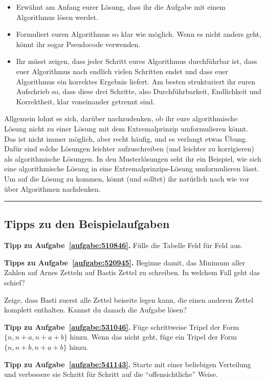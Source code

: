 \begin{itemize}
	\item Erwähnt am Anfang eurer Lösung, dass ihr die Aufgabe mit einem Algorithmus lösen werdet.
	\item Formuliert euren Algorithmus so klar wie möglich. Wenn es nicht anders geht, könnt ihr sogar Pseudocode verwenden.
	\item Ihr müsst zeigen, dass jeder Schritt eures Algorithmus durchführbar ist, dass euer Algorithmus nach endlich vielen Schritten endet und dass euer Algorithmus ein korrektes Ergebnis liefert. Am besten strukturiert ihr euren Aufschrieb so, dass diese drei Schritte, also Durchführbarkeit, Endlichkeit und Korrektheit, klar voneinander getrennt sind.
\end{itemize}
Allgemein lohnt es sich, darüber nachzudenken, ob ihr eure algorithmische Lösung nicht zu einer Lösung mit dem Extremalprinzip umformulieren könnt. Das ist nicht immer möglich, aber recht häufig, und es verlangt etwas Übung. Dafür sind solche Lösungen leichter aufzuschreiben (und leichter zu korrigieren) als algorithmische Lösungen. In den Musterlösungen seht ihr ein Beispiel, wie sich eine algorithmische Lösung in eine Extremalprinzips-Lösung umformulieren lässt. Um auf die Lösung zu kommen, könnt (und solltet) ihr natürlich nach wie vor über Algorithmen nachdenken.

\vfill\hrule\vspace{-1em}

\subsection*{Tipps zu den Beispielaufgaben}
\textbf{Tipp zu Aufgabe~\ref{aufgabe:510846}.} Fülle die Tabelle Feld für Feld aus.

\textbf{Tipps zu Aufgabe~\ref{aufgabe:520945}.} Beginne damit, das Minimum aller Zahlen auf Arnes Zetteln auf Bastis Zettel zu schreiben. In welchem Fall geht das schief?

Zeige, dass Basti zuerst alle Zettel beiseite legen kann, die einen anderen Zettel komplett enthalten. Kannst du danach die Aufgabe lösen?

\textbf{Tipp zu Aufgabe~\ref{aufgabe:531046}.} Füge schrittweise Tripel der Form $\{n,n+a,n+a+b\}$ hinzu. Wenn das nicht geht, füge ein Tripel der Form $\{n,n+b,n+a+b\}$ hinzu.

\textbf{Tipp zu Aufgabe~\ref{aufgabe:541143}.} Starte mit einer beliebigen Verteilung und verbessere sie Schritt für Schritt auf die \enquote{offensichtliche} Weise.
